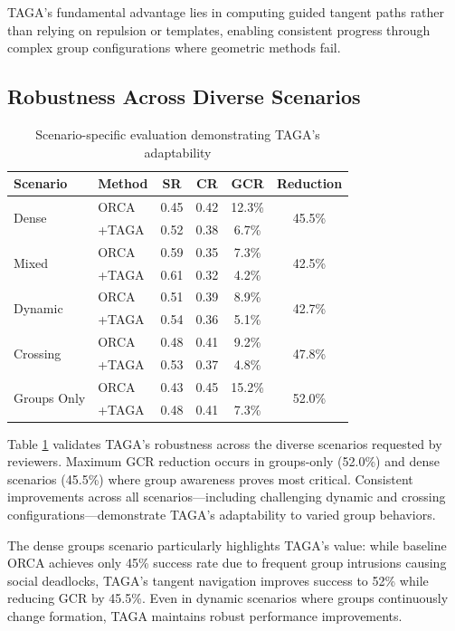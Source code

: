 TAGA's fundamental advantage lies in computing guided tangent paths rather than relying on repulsion or templates, enabling consistent progress through complex group configurations where geometric methods fail.

\subsection{Robustness Across Diverse Scenarios}

\begin{table}[t]
\caption{Scenario-specific evaluation demonstrating TAGA's adaptability}
\label{table:scenarios}
\centering
\small
\setlength{\tabcolsep}{3.5pt}
\begin{tabular}{llcccc}
\hline
\textbf{Scenario} & \textbf{Method} & \textbf{SR} & \textbf{CR} & \textbf{GCR} & \textbf{Reduction} \\
\hline
\multirow{2}{*}{Dense} 
& ORCA & 0.45 & 0.42 & 12.3\% & \multirow{2}{*}{45.5\%}\\
& +TAGA & 0.52 & 0.38 & 6.7\% & \\
\hline
\multirow{2}{*}{Mixed}
& ORCA & 0.59 & 0.35 & 7.3\% & \multirow{2}{*}{42.5\%}\\
& +TAGA & 0.61 & 0.32 & 4.2\% & \\
\hline
\multirow{2}{*}{Dynamic}
& ORCA & 0.51 & 0.39 & 8.9\% & \multirow{2}{*}{42.7\%}\\
& +TAGA & 0.54 & 0.36 & 5.1\% & \\
\hline
\multirow{2}{*}{Crossing}
& ORCA & 0.48 & 0.41 & 9.2\% & \multirow{2}{*}{47.8\%}\\
& +TAGA & 0.53 & 0.37 & 4.8\% & \\
\hline
\multirow{2}{*}{Groups Only}
& ORCA & 0.43 & 0.45 & 15.2\% & \multirow{2}{*}{52.0\%}\\
& +TAGA & 0.48 & 0.41 & 7.3\% & \\
\hline
\end{tabular}
\end{table}

Table \ref{table:scenarios} validates TAGA's robustness across the diverse scenarios requested by reviewers. Maximum GCR reduction occurs in groups-only (52.0\%) and dense scenarios (45.5\%) where group awareness proves most critical. Consistent improvements across all scenarios—including challenging dynamic and crossing configurations—demonstrate TAGA's adaptability to varied group behaviors.

The dense groups scenario particularly highlights TAGA's value: while baseline ORCA achieves only 45\% success rate due to frequent group intrusions causing social deadlocks, TAGA's tangent navigation improves success to 52\% while reducing GCR by 45.5\%. Even in dynamic scenarios where groups continuously change formation, TAGA maintains robust performance improvements.

